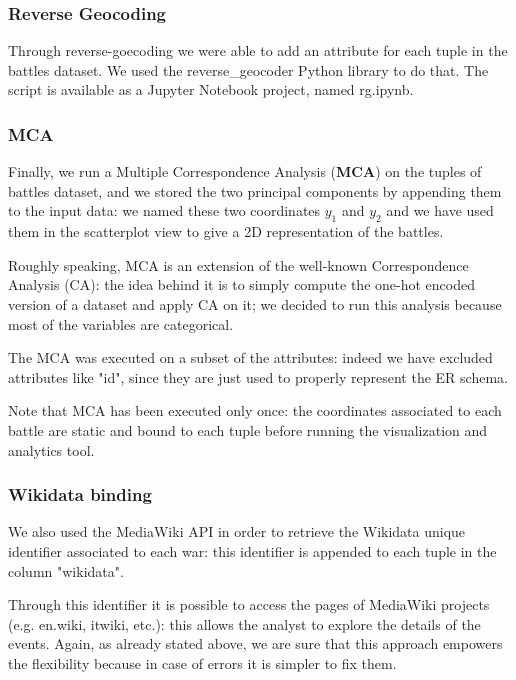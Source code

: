 \subsubsection{Reverse Geocoding}
Through reverse-goecoding we were able to add an attribute for each tuple in the battles dataset. We used the reverse\_geocoder Python library to do that. The script is available as a Jupyter Notebook project, named rg.ipynb. 

\subsubsection{MCA}
Finally, we run a Multiple Correspondence Analysis (\textbf{MCA}) on the tuples of battles dataset, and we stored the two principal components by appending them to the input data: we named these two coordinates $y_1$ and $y_2$ and we have used them in the scatterplot view to give a 2D representation of the battles.

Roughly speaking, MCA is an extension of the well-known Correspondence Analysis (CA): the idea behind it is to simply compute the one-hot encoded version of a dataset and apply CA on it; we decided to run this analysis because most of the variables are categorical.

The MCA was executed on a subset of the attributes: indeed we have excluded attributes like "id", since they are just used to properly represent the ER schema.

Note that MCA has been executed only once: the coordinates associated to each battle are static and bound to each tuple before running the visualization and analytics tool.

\subsubsection{Wikidata binding}
We also used the MediaWiki API in order to retrieve the Wikidata unique identifier associated to each war: this identifier is appended to each tuple in the column "wikidata".

Through this identifier it is possible to access the pages of MediaWiki projects (e.g. en.wiki, itwiki, etc.): this allows the analyst to explore the details of the events. Again, as already stated above, we are sure that this approach empowers the flexibility because in case of errors it is simpler to fix them.

